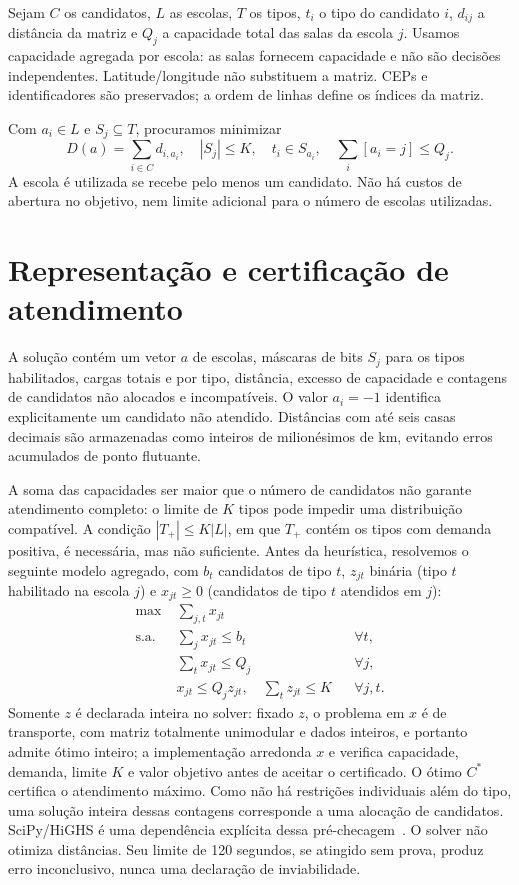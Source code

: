 \documentclass[12pt]{article}
\begin{document}
Sejam $C$ os candidatos, $L$ as escolas, $T$ os tipos, $t_i$ o tipo do candidato $i$, $d_{ij}$ a distância da matriz e $Q_j$ a capacidade total das salas da escola $j$. Usamos capacidade agregada por escola: as salas fornecem capacidade e não são decisões independentes. Latitude/longitude não substituem a matriz. CEPs e identificadores são preservados; a ordem de linhas define os índices da matriz.

Com $a_i\in L$ e $S_j\subseteq T$, procuramos minimizar
\begin{equation}
 D(a)=\sum_{i\in C}d_{i,a_i},\quad
 |S_j|\leq K,\quad t_i\in S_{a_i},\quad
 \sum_i [a_i=j]\leq Q_j.
\end{equation}
A escola é utilizada se recebe pelo menos um candidato. Não há custos de abertura no objetivo, nem limite adicional para o número de escolas utilizadas.

\section{Representação e certificação de atendimento}
A solução contém um vetor $a$ de escolas, máscaras de bits $S_j$ para os tipos habilitados, cargas totais e por tipo, distância, excesso de capacidade e contagens de candidatos não alocados e incompatíveis. O valor $a_i=-1$ identifica explicitamente um candidato não atendido. Distâncias com até seis casas decimais são armazenadas como inteiros de milionésimos de km, evitando erros acumulados de ponto flutuante.

A soma das capacidades ser maior que o número de candidatos não garante atendimento completo: o limite de $K$ tipos pode impedir uma distribuição compatível. A condição $|T_+|\leq K|L|$, em que $T_+$ contém os tipos com demanda positiva, é necessária, mas não suficiente. Antes da heurística, resolvemos o seguinte modelo agregado, com $b_t$ candidatos de tipo $t$, $z_{jt}$ binária (tipo $t$ habilitado na escola $j$) e $x_{jt}\geq 0$ (candidatos de tipo $t$ atendidos em $j$):
\begin{align}
\max\;&\sum_{j,t}x_{jt} \\
\text{s.a. }&\sum_jx_{jt}\leq b_t &&\forall t,\\
&\sum_tx_{jt}\leq Q_j &&\forall j,\\
&x_{jt}\leq Q_jz_{jt},\quad \sum_tz_{jt}\leq K &&\forall j,t.
\end{align}
Somente $z$ é declarada inteira no solver: fixado $z$, o problema em $x$ é de transporte, com matriz totalmente unimodular e dados inteiros, e portanto admite ótimo inteiro; a implementação arredonda $x$ e verifica capacidade, demanda, limite $K$ e valor objetivo antes de aceitar o certificado. O ótimo $C^*$ certifica o atendimento máximo. Como não há restrições individuais além do tipo, uma solução inteira dessas contagens corresponde a uma alocação de candidatos. SciPy/HiGHS é uma dependência explícita dessa pré-checagem~\cite{scipy}. O solver não otimiza distâncias. Seu limite de 120 segundos, se atingido sem prova, produz erro inconclusivo, nunca uma declaração de inviabilidade.
\end{document}
